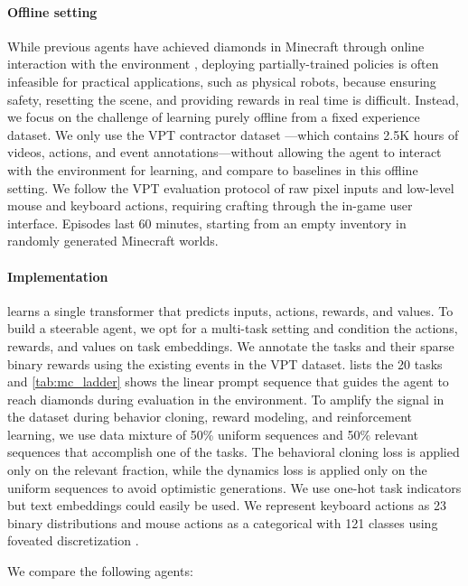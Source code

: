 \documentclass[11pt]{article}
\begin{document}
\paragraph{Offline setting}
While previous agents have achieved diamonds in Minecraft through online interaction with the environment \citep{vpt,dreamerv3}, deploying partially-trained policies is often infeasible for practical applications, such as physical robots, because ensuring safety, resetting the scene, and providing rewards in real time is difficult.
Instead, we focus on the challenge of learning purely offline from a fixed experience dataset.
We only use the VPT contractor dataset \citep{vpt}---which contains 2.5K hours of videos, actions, and event annotations---without allowing the agent to interact with the environment for learning, and compare to baselines in this offline setting.
We follow the VPT evaluation protocol of raw pixel inputs and low-level mouse and keyboard actions, requiring crafting through the in-game user interface.
Episodes last 60 minutes, starting from an empty inventory in randomly generated Minecraft worlds.

\paragraph{Implementation}
\method learns a single transformer that predicts inputs, actions, rewards, and values.
To build a steerable agent, we opt for a multi-task setting and condition the actions, rewards, and values on task embeddings.
We annotate the tasks and their sparse binary rewards using the existing events in the VPT dataset.
 lists the 20 tasks and \cref{tab:mc_ladder} shows the linear prompt sequence that guides the agent to reach diamonds during evaluation in the environment.
To amplify the signal in the dataset during behavior cloning, reward modeling, and reinforcement learning, we use data mixture of 50\% uniform sequences and 50\% relevant sequences that accomplish one of the tasks.
The behavioral cloning loss is applied only on the relevant fraction, while the dynamics loss is applied only on the uniform sequences to avoid optimistic generations.
We use one-hot task indicators but text embeddings could easily be used.
We represent keyboard actions as 23 binary distributions and mouse actions as a categorical with 121 classes using foveated discretization \citep{vpt}.

\pagebreak
We compare the following agents:
\end{document}
